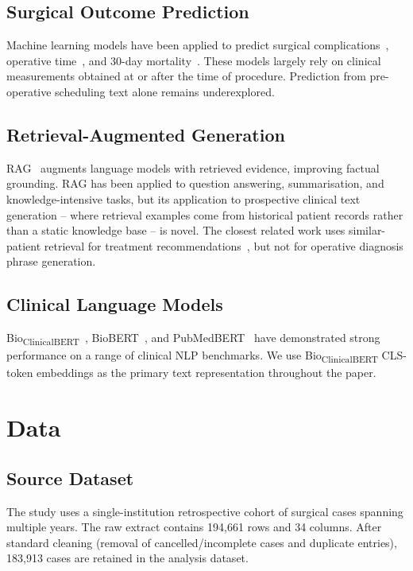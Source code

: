 \documentclass[10pt,twocolumn]{article}
\begin{document}
\subsection{Surgical Outcome Prediction}
Machine learning models have been applied to predict surgical complications~\cite{bihorac2019}, operative time~\cite{abbou2021,barsom2021systematic}, and 30-day mortality~\cite{knaus1991apache}. These models largely rely on clinical measurements obtained at or after the time of procedure. Prediction from pre-operative scheduling text alone remains underexplored.

\subsection{Retrieval-Augmented Generation}
RAG~\cite{lewis2020retrieval} augments language models with retrieved evidence, improving factual grounding. RAG has been applied to question answering, summarisation, and knowledge-intensive tasks, but its application to prospective clinical text generation -- where retrieval examples come from historical patient records rather than a static knowledge base -- is novel. The closest related work uses similar-patient retrieval for treatment recommendations~\cite{wang2023retrieval}, but not for operative diagnosis phrase generation.

\subsection{Clinical Language Models}
Bio\textsubscript{ClinicalBERT}~\cite{alsentzer2019publicly}, BioBERT~\cite{lee2020biobert}, and PubMedBERT~\cite{gu2021domain} have demonstrated strong performance on a range of clinical NLP benchmarks. We use Bio\textsubscript{ClinicalBERT} CLS-token embeddings as the primary text representation throughout the paper.

\section{Data}
\label{sec:data}

\subsection{Source Dataset}
The study uses a single-institution retrospective cohort of surgical cases spanning multiple years. The raw extract contains 194,661 rows and 34 columns. After standard cleaning (removal of cancelled/incomplete cases and duplicate entries), 183,913 cases are retained in the analysis dataset.
\end{document}

